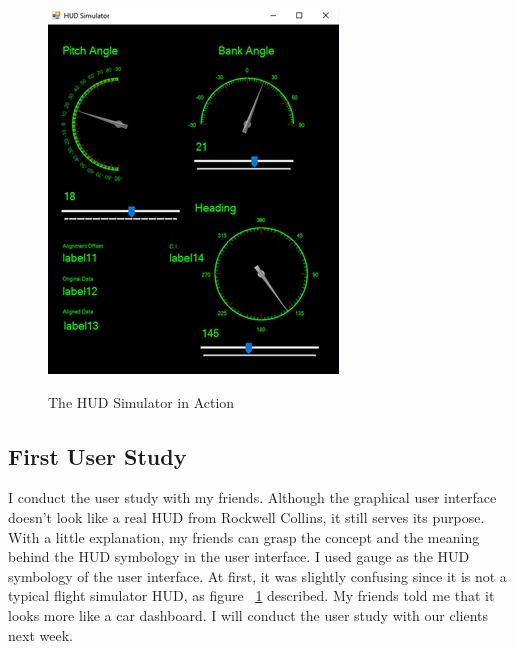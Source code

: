 \begin{figure}
    \caption{The HUD Simulator in Action}
    \includegraphics{img/hudsimaction}
    \label{fig:hudsimaction}
\end{figure}

\subsection{First User Study}
I conduct the user study with my friends. Although the graphical user interface doesn’t look like a real HUD from Rockwell Collins, it still serves its purpose. With a little explanation, my friends can grasp the concept and the meaning behind the HUD symbology in the user interface. I used gauge as the HUD symbology of the user interface. At first, it was slightly confusing since it is not a typical flight simulator HUD, as figure ~\ref{fig:hudsimaction} described. My friends told me that it looks more like a car dashboard. I will conduct the user study with our clients next week.  






